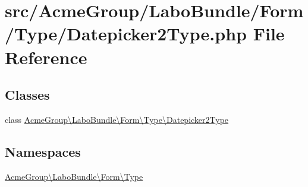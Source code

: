 \hypertarget{_datepicker2_type_8php}{\section{src/\+Acme\+Group/\+Labo\+Bundle/\+Form/\+Type/\+Datepicker2\+Type.php File Reference}
\label{_datepicker2_type_8php}
}
\subsection*{Classes}
\begin{DoxyCompactItemize}
\item 
class \hyperlink{class_acme_group_1_1_labo_bundle_1_1_form_1_1_type_1_1_datepicker2_type}{Acme\+Group\textbackslash{}\+Labo\+Bundle\textbackslash{}\+Form\textbackslash{}\+Type\textbackslash{}\+Datepicker2\+Type}
\end{DoxyCompactItemize}
\subsection*{Namespaces}
\begin{DoxyCompactItemize}
\item 
 \hyperlink{namespace_acme_group_1_1_labo_bundle_1_1_form_1_1_type}{Acme\+Group\textbackslash{}\+Labo\+Bundle\textbackslash{}\+Form\textbackslash{}\+Type}
\end{DoxyCompactItemize}
